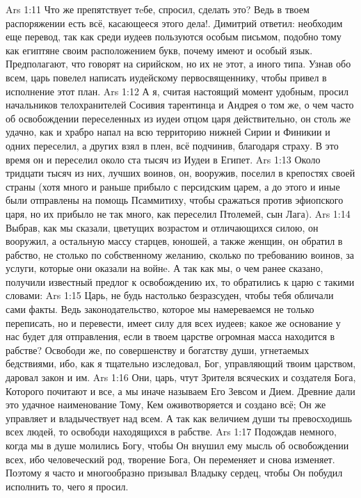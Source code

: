 \vs Ars 1:11
Что же препятствует тeбе, спросил, сделать это? Ведь в твоем распоряжении есть всё, касающееся этого дела!. Димитрий ответил: необходим еще перевод, так как среди иудеев пользуются особым письмом, подобно тому как египтяне своим расположением букв, почему имеют и особый язык. Предполагают, что говорят на сирийском, но их не этот, а иного типа. Узнав обо всем, царь повелел написать иудейскому первосвященнику, чтобы привел в исполнение этот план.
\vs Ars 1:12
А я, считая настоящий момент удобным, просил начальников телохранителей Сосивия тарентинца и Андрея о том же, о чем часто об освобождении переселенных из иудеи отцом царя действительно, он столь же удачно, как и храбро напал на всю территорию нижней Сирии и Финикии и одних переселил, а других взял в плен, всё подчинив, благодаря страху. В это время он и переселил около ста тысяч из Иудеи в Египет.
\vs Ars 1:13
Около тридцати тысяч из них, лучших воинов, он, вооружив, поселил в крепостях своей страны (хотя много и раньше прибыло с персидским царем, а до этого и иные были отправлены на помощь Псаммитиху, чтобы сражаться против эфиопского царя, но их прибыло не так много, как переселил Птолемей, сын Лага).
\vs Ars 1:14
Выбрав, как мы сказали, цветущих возрастом и отличающихся силою, он вооружил, а остальную массу старцев, юношей, а также женщин, он обратил в рабство, не столько по собственному желанию, сколько по требованию воинов, за услуги, которые они оказали на войнe. А так как мы, о чем ранее сказано, получили известный предлог к освобождению их, то обратились к царю с такими словами:
\vs Ars 1:15
Царь, не будь настолько безразсуден, чтобы тебя обличали сами факты. Ведь законодательство, которое мы намереваемся не только переписать, но и перевести, имеет силу для всех иудеев; какое же основание у нас будет для отправления, если в твоем царстве огромная масса находится в рабстве? Освободи же, по совершенству и богатству души, угнетаемых бедствиями, ибо, как я тщательно изследовал, Бог, управляющий твоим царством, даровал закон и им.
\vs Ars 1:16
Они, царь, чтут Зрителя всяческих и создателя Бога, Которого почитают и все, а мы иначе называем Его Зевсом и Дием. Древние дали это удачное наименование Тому, Кем оживотворяется и создано всё; Он же управляет и владычествует над всем. А так как величием души ты превосходишь всех людей, то освободи находящихся в рабстве.
\vs Ars 1:17
Подождав немного, когда мы в душе молились Богу, чтобы Он внушил ему мысль об освобождении всех, ибо человеческий род, творение Бога, Он переменяет и снова изменяет. Поэтому я часто и многообразно призывал Владыку сердец, чтобы Он побудил исполнить то, чего я просил.
